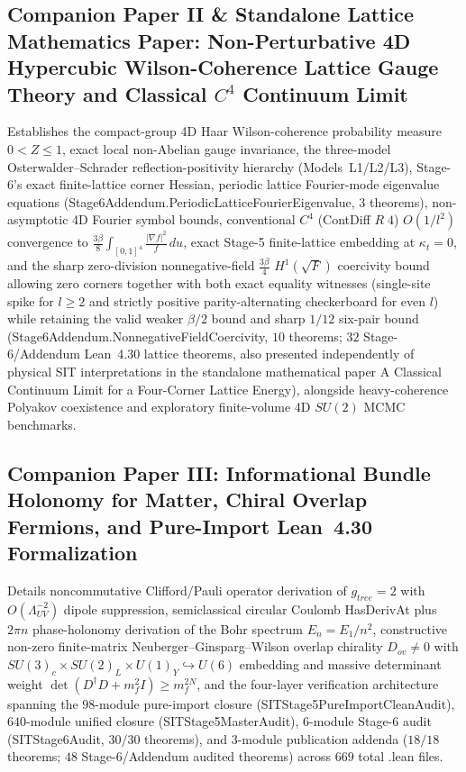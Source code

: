 \documentclass[american,11pt,letterpaper]{article}
\def\mathbb#1{#1}%
\def\mathrm#1{#1}%
\def\texttt#1{#1}%
\def\emph#1{#1}%
\begin{document}
\subsection{Companion Paper II \& Standalone Lattice Mathematics Paper: Non-Perturbative 4D Hypercubic Wilson-Coherence Lattice Gauge Theory and Classical $C^4$ Continuum Limit}

Establishes the compact-group 4D Haar Wilson-coherence probability measure $0 < Z \le 1$, exact local non-Abelian gauge invariance, the three-model Osterwalder--Schrader reflection-positivity hierarchy (Models~L1/L2/L3), Stage-6's exact finite-lattice corner Hessian, periodic lattice Fourier-mode eigenvalue equations (\texttt{Stage6Addendum.\allowbreak{}PeriodicLatticeFourierEigenvalue}, $3$ theorems), non-asymptotic 4D Fourier symbol bounds, conventional $C^4$ (\texttt{ContDiff} $\mathbb{R}\;4$) $O(1/l^2)$ convergence to $\frac{3\beta}{8}\int_{[0,1]^4}\frac{|\nabla f|^2}{f}\,du$, exact Stage-5 finite-lattice embedding at $\kappa_t = 0$, and the sharp zero-division nonnegative-field $\frac{3\beta}{4}$ $H^1(\sqrt{F})$ coercivity bound allowing zero corners together with both exact equality witnesses (single-site spike for $l \ge 2$ and strictly positive parity-alternating checkerboard for even $l$) while retaining the valid weaker $\beta/2$ bound and sharp $1/12$ six-pair bound (\texttt{Stage6Addendum.\allowbreak{}NonnegativeFieldCoercivity}, $10$ theorems; $32$ Stage-6/Addendum Lean~4.30 lattice theorems, also presented independently of physical SIT interpretations in the standalone mathematical paper \emph{A Classical Continuum Limit for a Four-Corner Lattice Energy}), alongside heavy-coherence Polyakov coexistence and exploratory finite-volume 4D $SU(2)$ MCMC benchmarks.

\subsection{Companion Paper III: Informational Bundle Holonomy for Matter, Chiral Overlap Fermions, and Pure-Import Lean~4.30 Formalization}

Details noncommutative Clifford/Pauli operator derivation of $g_{\mathrm{tree}} = 2$ with $O(\Lambda_{\mathrm{UV}}^{-2})$ dipole suppression, semiclassical circular Coulomb \texttt{HasDerivAt} plus $2\pi n$ phase-holonomy derivation of the Bohr spectrum $E_n = E_1/n^2$, constructive non-zero finite-matrix Neuberger--Ginsparg--Wilson overlap chirality $D_{\mathrm{ov}} \ne 0$ with $SU(3)_c\times SU(2)_L\times U(1)_Y \hookrightarrow U(6)$ embedding and massive determinant weight $\det(D^\dagger D + m_f^2 I) \ge m_f^{2N}$, and the four-layer verification architecture spanning the $98$-module pure-import closure (\texttt{SITStage5\allowbreak{}Pure\allowbreak{}Import\allowbreak{}Clean\allowbreak{}Audit}), $640$-module unified closure (\texttt{SITStage5MasterAudit}), $6$-module Stage-6 audit (\texttt{SITStage6Audit}, $30/30$ theorems), and $3$-module publication addenda ($18/18$ theorems; $48$ Stage-6/Addendum audited theorems) across $669$ total \texttt{.lean} files.
\end{document}
